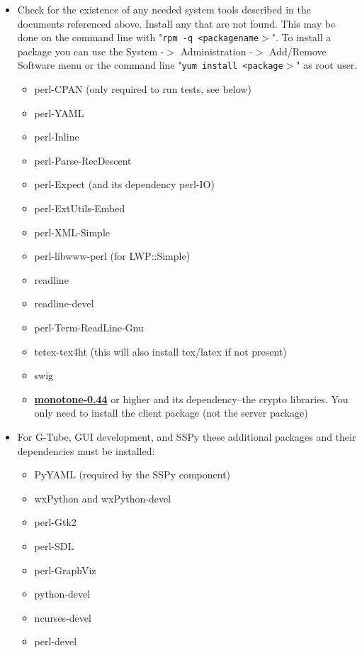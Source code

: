 \documentclass[12pt]{article}
\begin{document}
\begin{itemize}
   \item[] Check for the existence of any needed system tools described in
the documents referenced above.  Install any that are not found.  This may be
done on the command line with "{\tt rpm -q <packagename$>$}".
To install a package you can use the System -$>$ Administration -$>$ Add/Remove
Software menu or the command line "{\tt yum install <package$>$}" as root user.

      \begin{itemize}
         \item perl-CPAN (only required to run tests, see below)
         \item perl-YAML
         \item perl-Inline
         \item perl-Parse-RecDescent
         \item perl-Expect (and its dependency perl-IO)
         \item perl-ExtUtils-Embed
         \item perl-XML-Simple
         \item perl-libwww-perl (for LWP::Simple)
         \item readline
         \item readline-devel
         \item perl-Term-ReadLine-Gnu
         \item tetex-tex4ht (this will also install tex/latex if not present)
         \item swig
         \item \href{http://monotone.ca/}{\bf monotone-0.44} or higher and its dependency--the crypto libraries. You only need to install the client package (not the server package) 
      \end{itemize}
   \item[] For G-Tube, GUI development, and SSPy these additional packages and their
dependencies must be installed:

    \begin{itemize}
         \item PyYAML (required by the SSPy component)
         \item wxPython and wxPython-devel
         \item perl-Gtk2
         \item perl-SDL
         \item perl-GraphViz
         \item python-devel
         \item ncurses-devel
         \item perl-devel
    \end{itemize}

\end{itemize}
 
\end{document}
